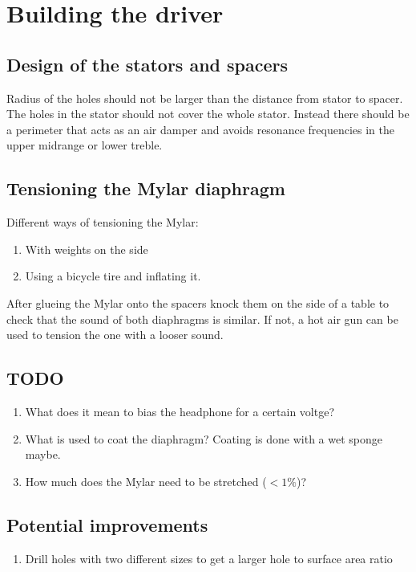 \documentclass{article}
\begin{document}
\section{Building the driver}
\label{s:driver}

\subsection{Design of the stators and spacers}
\label{s:driver:design}
Radius of the holes should not be larger than the distance from stator to spacer. The holes in the stator should not cover the whole stator. Instead there should be a perimeter that acts as an air damper and avoids resonance frequencies in the upper midrange or lower treble.

\subsection{Tensioning the Mylar diaphragm}
\label{s:driver:tension}
Different ways of tensioning the Mylar:
\begin{enumerate}
    \item With weights on the side
    \item Using a bicycle tire and inflating it.
\end{enumerate}
After glueing the Mylar onto the spacers knock them on the side of a table to check that the sound of both diaphragms is similar. If not, a hot air gun can be used to tension the one with a looser sound.

\subsection{TODO}
\begin{enumerate}
    \item What does it mean to bias the headphone for a certain voltge?
    \item What is used to coat the diaphragm? Coating is done with a wet sponge maybe.
    \item How much does the Mylar need to be stretched ($< 1\%$)?
\end{enumerate}

\subsection{Potential improvements}
\begin{enumerate}
    \item Drill holes with two different sizes to get a larger hole to surface area ratio
\end{enumerate}
\end{document}
